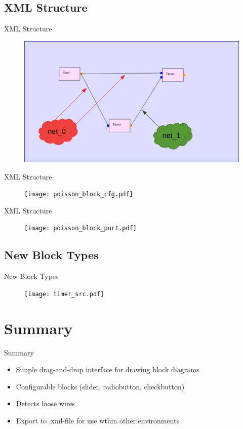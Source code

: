 \documentclass{beamer}
\begin{document}
\subsection*{XML Structure}
\begin{frame}{XML Structure}
    \begin{figure}
        \includegraphics[width=\linewidth]{poisson_nets.png}
        \label{fig:poisson_nets}
    \end{figure}
\end{frame}
\begin{frame}{XML Structure}
    \begin{figure}
        \texttt{[image: poisson\_block\_cfg.pdf]}
        \label{fig:poisson_block_cfg}
    \end{figure}
\end{frame}
\begin{frame}{XML Structure}
    \begin{figure}
        \texttt{[image: poisson\_block\_port.pdf]}
        \label{fig:poisson_block_port}
    \end{figure}
\end{frame}


\subsection*{New Block Types}
\begin{frame}{New Block Types}
    \begin{figure}
        \texttt{[image: timer\_src.pdf]}
        \label{fig:timer_src}
    \end{figure}
\end{frame}

\section{Summary}
\begin{frame}{Summary}
	\begin{itemize}
		\item<2->  Simple drag-and-drop interface for drawing block diagrams
        \item<3->  Configurable blocks (slider, radiobutton, checkbutton)
		\item<4->  Detects loose wires
        \item<5->  Export to .xml-file for use wthin other environments
	\end{itemize}
\end{frame}
\end{document}

